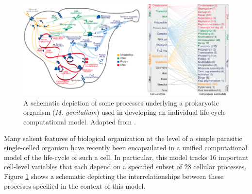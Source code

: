 \begin{figure}
\begin{center}
\noindent\includegraphics[width=0.95\columnwidth]{fig/cellprocessesdiagram.pdf}
\end{center}
\caption{A schematic depiction of some processes underlying a prokaryotic organism (\emph{M. genitalium}) used in developing an individual life-cycle computational model. Adapted from \cite{Karr2012}.}
\label{fig:cellprocess}
\end{figure}
Many salient features of biological organization at the level of a simple parasitic single-celled organism have recently been encapsulated in a unified computational model of the life-cycle of such a cell. In particular, this model tracks 16 important cell-level variables that each depend on a specified subset of 28 cellular processes. Figure \ref{fig:cellprocess} shows a schematic depicting the interrelationships between these processes specified in the context of this model.

